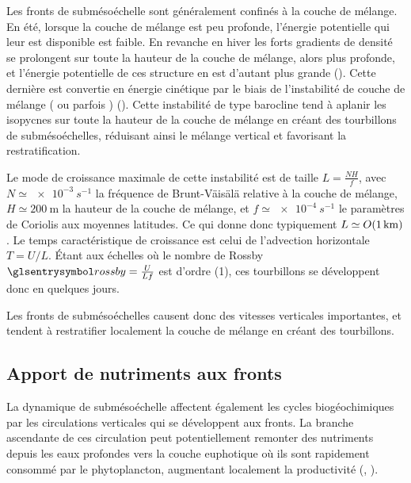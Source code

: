 Les fronts de submésoéchelle sont généralement confinés à la couche de mélange.
En été, lorsque la couche de mélange est peu profonde, l'énergie potentielle qui leur est disponible est faible.
En revanche en hiver les forts gradients de densité se prolongent sur toute la hauteur de la couche de mélange, alors plus profonde, et l'énergie potentielle de ces structure en est d'autant plus grande (\cite{mensa_2013,callies_2015,buckingham_2016,sasaki_2020}).
Cette dernière est convertie en énergie cinétique par le biais de l'instabilité de couche de mélange ( ou parfois ) (\cite{boccaletti_2007,fox-kemper_2008}).
Cette instabilité de type barocline tend à aplanir les isopycnes sur toute la hauteur de la couche de mélange en créant des tourbillons de submésoéchelles, réduisant ainsi le mélange vertical et favorisant la restratification.

\begin{note}
  Le mode de croissance maximale de cette instabilité est de taille \(L = \frac{NH}{f}\), avec \(N \simeq \qty{e-3}{s^{-1}}\) la fréquence de Brunt-Väisälä relative à la couche de mélange, \(H \simeq \qty{200}{\meter}\) la hauteur de la couche de mélange, et \(f \simeq \qty{e-4}{s^{-1}}\) le paramètres de Coriolis aux moyennes latitudes.
  Ce qui donne donc typiquement \(L \simeq \OM(\qty{1}{\km})\).
  Le temps caractéristique de croissance est celui de l'advection horizontale \(T = U/L\). Étant aux échelles où le nombre de Rossby \(\am{rossby} = \frac{U}{Lf}\) est d'ordre \OM(1), ces tourbillons se développent donc en quelques jours.
\end{note}

Les fronts de submésoéchelles causent donc des vitesses verticales importantes, et tendent à restratifier localement la couche de mélange en créant des tourbillons.

\subsection{Apport de nutriments aux fronts}
\label{sec:upwelling-nutriments}

La dynamique de submésoéchelle affectent également les cycles biogéochimiques par les circulations verticales qui se développent aux fronts.
La branche ascendante de ces circulation peut potentiellement remonter des nutriments depuis les eaux profondes vers la couche euphotique où ils sont rapidement consommé par le phytoplancton, augmentant localement la productivité (, \cite{klein_2009,calil_2011,mahadevan_2000,mahadevan_2016,mcwilliams_2016,levy_2001,levy_2012,levy_2018}).

